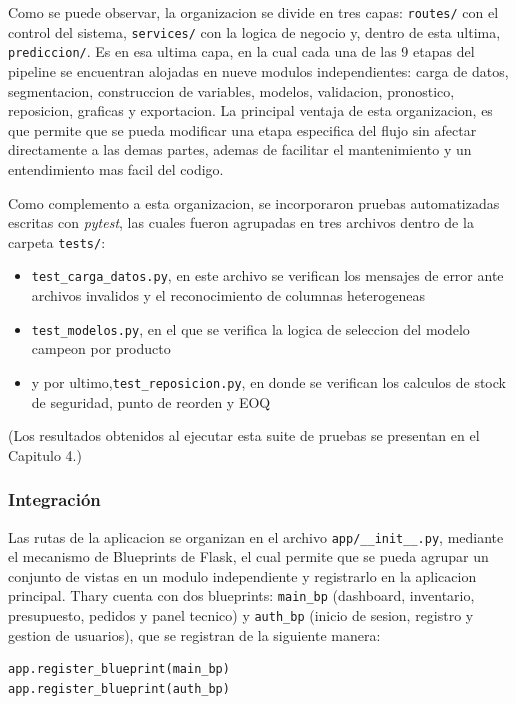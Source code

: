 Como se puede observar, la organizacion se divide en tres capas: \texttt{routes/} con el control del sistema, \texttt{services/} con la logica de negocio y, dentro de esta ultima, \texttt{prediccion/}. Es en esa ultima capa, en la cual cada una de las 9 etapas del pipeline se encuentran alojadas en nueve modulos independientes: carga de datos, segmentacion, construccion de variables, modelos, validacion, pronostico, reposicion, graficas y exportacion. La principal ventaja de esta organizacion, es que permite que se pueda modificar una etapa especifica del flujo sin afectar directamente a las demas partes, ademas de facilitar el mantenimiento y un entendimiento mas facil del codigo.

Como complemento a esta organizacion, se incorporaron pruebas automatizadas escritas con \textit{pytest}, las cuales fueron agrupadas en tres archivos dentro de la carpeta \texttt{tests/}:

\begin{itemize}
    \item \texttt{test\_carga\_datos.py}, en este archivo se verifican los mensajes de error ante archivos invalidos y el reconocimiento de columnas heterogeneas
    \item \texttt{test\_modelos.py}, en el que se verifica la logica de seleccion del modelo campeon por producto
    \item y por ultimo,\texttt{test\_reposicion.py}, en donde se verifican los calculos de stock de seguridad, punto de reorden y EOQ
\end{itemize}

(Los resultados obtenidos al ejecutar esta suite de pruebas se presentan en el Capitulo 4.)

\subsubsection{Integración}

Las rutas de la aplicacion se organizan en el archivo \texttt{app/\_\_init\_\_.py}, mediante el mecanismo de Blueprints de Flask, el cual permite que se pueda agrupar un conjunto de vistas en un modulo independiente y registrarlo en la aplicacion principal. Thary cuenta con dos blueprints: \texttt{main\_bp} (dashboard, inventario, presupuesto, pedidos y panel tecnico) y \texttt{auth\_bp} (inicio de sesion, registro y gestion de usuarios), que se registran de la siguiente manera:

\label{lst:registro_blueprints}
\begin{verbatim}
app.register_blueprint(main_bp)
app.register_blueprint(auth_bp)
\end{verbatim}


